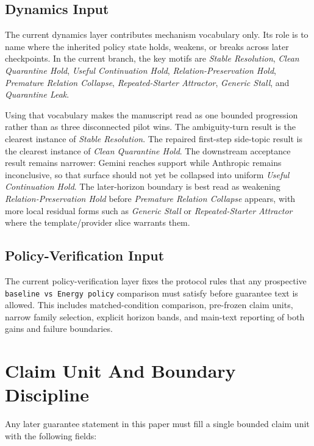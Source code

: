 \documentclass[11pt]{article}
\begin{document}
\subsection{Dynamics Input}

The current dynamics layer contributes mechanism vocabulary only. Its role is to
name where the inherited policy state holds, weakens, or breaks across later
checkpoints. In the current branch, the key motifs are \textit{Stable
Resolution}, \textit{Clean Quarantine Hold}, \textit{Useful Continuation Hold},
\textit{Relation-Preservation Hold}, \textit{Premature Relation Collapse},
\textit{Repeated-Starter Attractor}, \textit{Generic Stall}, and
\textit{Quarantine Leak}.

Using that vocabulary makes the manuscript read as one bounded progression rather
than as three disconnected pilot wins. The ambiguity-turn result is the clearest
instance of \textit{Stable Resolution}. The repaired first-step side-topic result
is the clearest instance of \textit{Clean Quarantine Hold}. The downstream
acceptance result remains narrower: Gemini reaches support while Anthropic
remains inconclusive, so that surface should not yet be collapsed into uniform
\textit{Useful Continuation Hold}. The later-horizon
boundary is best read as weakening \textit{Relation-Preservation Hold} before
\textit{Premature Relation Collapse} appears, with more local residual forms such
as \textit{Generic Stall} or \textit{Repeated-Starter Attractor} where the
template/provider slice warrants them.

\subsection{Policy-Verification Input}

The current policy-verification layer fixes the protocol rules that any prospective
\texttt{baseline vs Energy policy} comparison must satisfy before guarantee text is
allowed. This includes matched-condition comparison, pre-frozen claim units, narrow
family selection, explicit horizon bands, and main-text reporting of both gains and
failure boundaries.

\section{Claim Unit And Boundary Discipline}

Any later guarantee statement in this paper must fill a single bounded claim unit
with the following fields:
\end{document}
